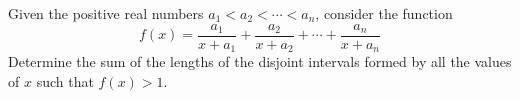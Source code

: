 Given the positive real numbers $a_{1}<a_{2}<\cdots<a_{n}$,  consider the function \[f(x)=\frac{a_{1}}{x+a_{1}}+\frac{a_{2}}{x+a_{2}}+\cdots+\frac{a_{n}}{x+a_{n}}\] Determine the sum of the lengths of the disjoint intervals formed by all the values of $x$ such that $f(x)>1$.